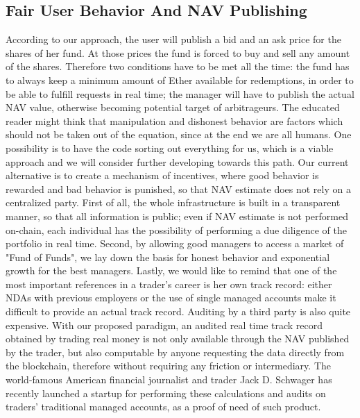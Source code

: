 \documentclass[9pt,oneside]{amsart}
\begin{document}
\begin{multicols}{2}
\subsection{Fair User Behavior And NAV Publishing}
According to our approach, the user will publish a bid and an ask price for the shares of her fund. At those prices the fund is forced to buy and sell any amount of the shares. Therefore two conditions have to be met all the time: the fund has to always keep a minimum amount of Ether available for redemptions, in order to be able to fulfill requests in real time; the manager will have to publish the actual NAV value, otherwise becoming potential target of arbitrageurs.
The educated reader might think that manipulation and dishonest behavior are factors which should not be taken out of the equation, since at the end we are all humans. One possibility is to have the code sorting out everything for us, which is a viable approach and we will consider further developing towards this path. Our current alternative is to create a mechanism of incentives, where good behavior is rewarded and bad behavior is punished, so that NAV estimate does not rely on a centralized party. First of all, the whole infrastructure is built in a transparent manner, so that all information is public; even if NAV estimate is not performed on-chain, each individual has the possibility of performing a due diligence of the portfolio in real time. Second, by allowing good managers to access a market of "Fund of Funds", we lay down the basis for honest behavior and exponential growth for the best managers.
Lastly, we would like to remind that one of the most important references in a trader's career is her own track record: either NDAs with previous employers or the use of single managed accounts make it difficult to provide an actual track record. Auditing by a third party is also quite expensive. With our proposed paradigm, an audited real time track record obtained by trading real money is not only available through the NAV published by the trader, but also computable by anyone requesting the data directly from the blockchain, therefore without requiring any friction or intermediary. The world-famous American financial journalist and trader Jack D. Schwager has recently launched a startup for performing these calculations and audits on traders' traditional managed accounts, as a proof of need of such product.


\end{multicols}
\end{document}
